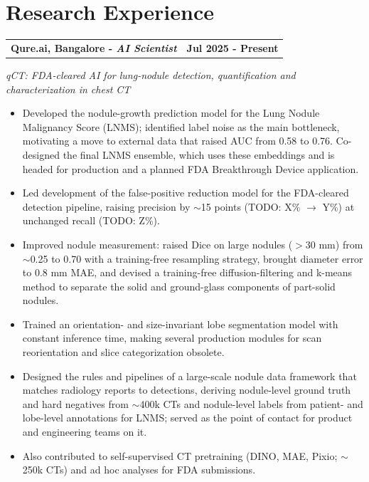 \documentclass[letterpaper,11pt]{article}
\begin{document}

\section{Research Experience}

\begin{tabularx}{\linewidth}{ @{}l X@{} }
\textbf{Qure.ai, Bangalore - \textit{AI Scientist}} & \hfill \textbf{Jul 2025 - Present} \\
\end{tabularx}
\vspace{-1.1em}

\textit{qCT: FDA-cleared AI for lung-nodule detection, quantification and characterization in chest CT}
\vspace{-0.5em}
\begin{itemize}
    \item[--] Developed the nodule-growth prediction model for the Lung Nodule Malignancy Score (LNMS); identified label noise as the main bottleneck, motivating a move to external data that raised AUC from 0.58 to 0.76. Co-designed the final LNMS ensemble, which uses these embeddings and is headed for production and a planned FDA Breakthrough Device application.\vspace{-0.5em}
    \item[--] Led development of the false-positive reduction model for the FDA-cleared detection pipeline, raising precision by $\sim$15 points (TODO: X\% $\rightarrow$ Y\%) at unchanged recall (TODO: Z\%).\vspace{-0.5em}
    \item[--] Improved nodule measurement: raised Dice on large nodules ($>$30 mm) from $\sim$0.25 to 0.70 with a training-free resampling strategy, brought diameter error to 0.8 mm MAE, and devised a training-free diffusion-filtering and k-means method to separate the solid and ground-glass components of part-solid nodules.\vspace{-0.5em}
    \item[--] Trained an orientation- and size-invariant lobe segmentation model with constant inference time, making several production modules for scan reorientation and slice categorization obsolete.\vspace{-0.5em}
    \item[--] Designed the rules and pipelines of a large-scale nodule data framework that matches radiology reports to detections, deriving nodule-level ground truth and hard negatives from $\sim$400k CTs and nodule-level labels from patient- and lobe-level annotations for LNMS; served as the point of contact for product and engineering teams on it.\vspace{-0.5em}
    \item[--] Also contributed to self-supervised CT pretraining (DINO, MAE, Pixio; $\sim$250k CTs) and ad hoc analyses for FDA submissions.
\end{itemize}
\end{document}

